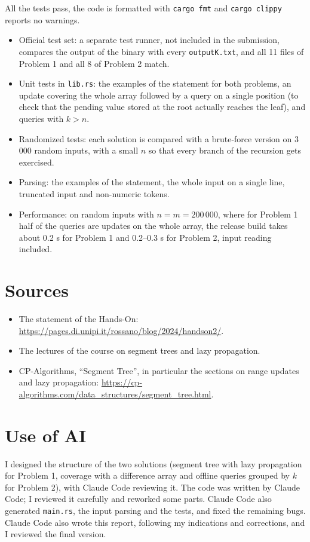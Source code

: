 \documentclass[11pt,a4paper]{article}
\begin{document}
All the tests pass, the code is formatted with \texttt{cargo fmt} and \texttt{cargo clippy} reports no
warnings.
\begin{itemize}
\item Official test set: a separate test runner, not included in the submission, compares the output of the
binary with every \texttt{outputK.txt}, and all 11 files of Problem 1 and all 8 of Problem 2 match.
\item Unit tests in \texttt{lib.rs}: the examples of the statement for both problems, an update covering the
whole array followed by a query on a single position (to check that the pending value stored at the root
actually reaches the leaf), and queries with $k > n$.
\item Randomized tests: each solution is compared with a brute-force version on 3\,000 random inputs, with a
small $n$ so that every branch of the recursion gets exercised.
\item Parsing: the examples of the statement, the whole input on a single line, truncated input and
non-numeric tokens.
\item Performance: on random inputs with $n = m = 200\,000$, where for Problem 1 half of the queries are
updates on the whole array, the release build takes about 0.2 s for Problem 1 and 0.2--0.3 s for Problem 2,
input reading included.
\end{itemize}

\section*{Sources}
\begin{itemize}
\item The statement of the Hands-On: \url{https://pages.di.unipi.it/rossano/blog/2024/handson2/}.
\item The lectures of the course on segment trees and lazy propagation.
\item CP-Algorithms, ``Segment Tree'', in particular the sections on range updates and lazy propagation:
\url{https://cp-algorithms.com/data_structures/segment_tree.html}.
\end{itemize}

\section*{Use of AI}
I designed the structure of the two solutions (segment tree with lazy propagation for Problem 1, coverage
with a difference array and offline queries grouped by $k$ for Problem 2), with Claude Code reviewing it.
The code was written by Claude Code; I reviewed it carefully and reworked some parts. Claude Code also
generated \texttt{main.rs}, the input parsing and the tests, and fixed the remaining bugs. Claude Code also
wrote this report, following my indications and corrections, and I reviewed the final version.
\end{document}
